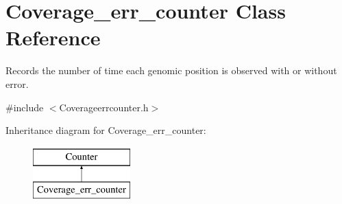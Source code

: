 \hypertarget{classCoverage__err__counter}{}\section{Coverage\+\_\+err\+\_\+counter Class Reference}
\label{classCoverage__err__counter}


Records the number of time each genomic position is observed with or without error.  




{\ttfamily \#include $<$Coverageerrcounter.\+h$>$}

Inheritance diagram for Coverage\+\_\+err\+\_\+counter\+:\begin{figure}[H]
\begin{center}
\leavevmode
\includegraphics[height=2.000000cm]{d1/d51/classCoverage__err__counter}
\end{center}
\end{figure}

